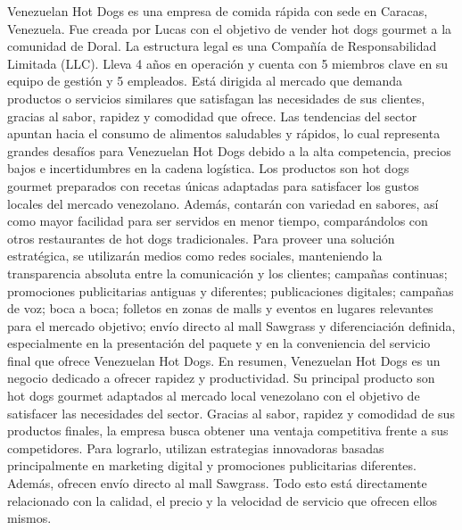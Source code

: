 Venezuelan Hot Dogs es una empresa de comida rápida con sede en Caracas, Venezuela. Fue creada por Lucas con el objetivo de vender hot dogs gourmet a la comunidad de Doral. La estructura legal es una Compañía de Responsabilidad Limitada (LLC). Lleva 4 años en operación y cuenta con 5 miembros clave en su equipo de gestión y 5 empleados. Está dirigida al mercado que demanda productos o servicios similares que satisfagan las necesidades de sus clientes, gracias al sabor, rapidez y comodidad que ofrece. Las tendencias del sector apuntan hacia el consumo de alimentos saludables y rápidos, lo cual representa grandes desafíos para Venezuelan Hot Dogs debido a la alta competencia, precios bajos e incertidumbres en la cadena logística.
Los productos son hot dogs gourmet preparados con recetas únicas adaptadas para satisfacer los gustos locales del mercado venezolano. Además, contarán con variedad en sabores, así como mayor facilidad para ser servidos en menor tiempo, comparándolos con otros restaurantes de hot dogs tradicionales. Para proveer una solución estratégica, se utilizarán medios como redes sociales, manteniendo la transparencia absoluta entre la comunicación y los clientes; campañas continuas; promociones publicitarias antiguas y diferentes; publicaciones digitales; campañas de voz; boca a boca; folletos en zonas de malls y eventos en lugares relevantes para el mercado objetivo; envío directo al mall Sawgrass y diferenciación definida, especialmente en la presentación del paquete y en la conveniencia del servicio final que ofrece Venezuelan Hot Dogs.
En resumen, Venezuelan Hot Dogs es un negocio dedicado a ofrecer rapidez y productividad. Su principal producto son hot dogs gourmet adaptados al mercado local venezolano con el objetivo de satisfacer las necesidades del sector. Gracias al sabor, rapidez y comodidad de sus productos finales, la empresa busca obtener una ventaja competitiva frente a sus competidores. Para lograrlo, utilizan estrategias innovadoras basadas principalmente en marketing digital y promociones publicitarias diferentes. Además, ofrecen envío directo al mall Sawgrass. Todo esto está directamente relacionado con la calidad, el precio y la velocidad de servicio que ofrecen ellos mismos.
